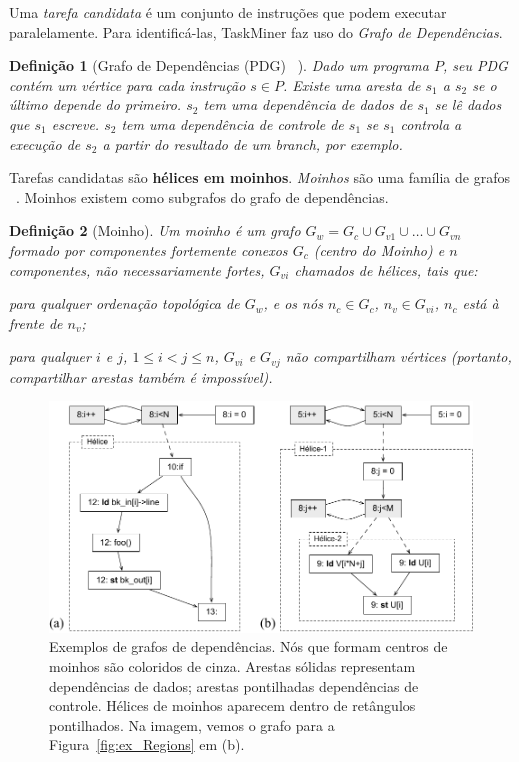 \documentclass[sigplan,10pt]{acmart}
\newcommand\Taskminer{\mbox{\textsf{TaskMiner}}}
\newtheorem{Definicao}{Defini\c{c}\~{a}o}
\begin{document}
Uma {\em tarefa candidata} é um conjunto de instruções que podem executar paralelamente.
Para identificá-las, {\Taskminer} faz uso do {\em Grafo de Dependências}. 

\begin{Definicao} [Grafo de Dependências (PDG) ~\cite{Ferrante87}]
\label{def:pdg}
Dado um programa
$P$, seu PDG contém um vértice para cada instrução $s \in P$. Existe uma aresta de 
$s_1$ a $s_2$ se o último depende do primeiro. $s_2$ tem uma dependência de dados de $s_1$
se lê dados que $s_1$ escreve. $s_2$ tem uma dependência de controle de $s_1$ se $s_1$ controla
a execução de $s_2$ a partir do resultado de um \textit{branch}, por exemplo.
\end{Definicao}

Tarefas candidatas são \textbf{hélices em moinhos}. {\em Moinhos} são uma família de grafos ~\cite{Rideau08}.
Moinhos existem como subgrafos do grafo de dependências. 

\begin{Definicao} [Moinho]
\label{def:moinho}
Um moinho é um grafo $G_w = G_c \cup G_{v1} \cup \ldots \cup G_{vn}$
formado por componentes fortemente conexos $G_c$ (centro do Moinho) e $n$ componentes, não necessariamente
fortes, $G_{vi}$ chamados de hélices, tais que:
\begin{compactenum}
\item para qualquer ordenação topológica de $G_w$, e os nós $n_c \in G_c$,
$n_v \in G_{vi}$, $n_c$ está à frente de $n_v$;
\item para qualquer $i$ e $j$, $1 \leq i < j \leq n$, $G_{vi}$ e $G_{vj}$ não
compartilham vértices (portanto, compartilhar arestas também é impossível).
\end{compactenum}
\end{Definicao}

\begin{figure}[h]
\begin{center}
\includegraphics[width=1\columnwidth]{images/ex_windmill}
\caption{Exemplos de grafos de dependências. Nós que formam centros de moinhos
são coloridos de cinza. Arestas sólidas representam dependências de dados; arestas pontilhadas
dependências de controle. Hélices de moinhos aparecem dentro de retângulos pontilhados.
Na imagem, vemos o grafo para a Figura~\ref{fig:ex_Regions} em (b).}
\label{fig:ex_windmill}
\end{center}
\end{figure}
\end{document}
